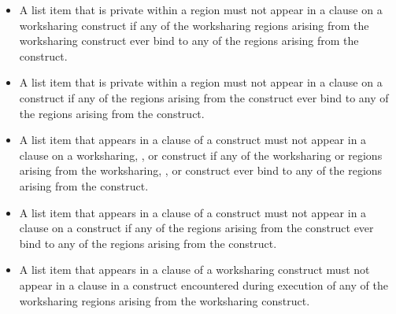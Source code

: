 \begin{itemize}
\item A list item that is private within a  region must
not appear in a  clause on a worksharing construct
if any of the worksharing regions arising
from the worksharing construct ever bind to any of the
 regions arising from the  construct.

\item A list item that is private within a  region must not appear in a
 clause on a  construct if any of the 
regions arising from the  construct ever bind to any of the 
regions arising from the  construct.

\item A list item that appears in a  clause of a 
construct must not appear in a  clause on a worksharing, ,
or  construct if any of the worksharing or  regions arising from
the worksharing, , or  construct ever bind to any of the
 regions arising from the  construct.

\item A list item that appears in a  clause of a  construct must not
appear in a  clause on a  construct if any of the
 regions arising from the  construct ever bind to any of
the  regions arising from the  construct.

\item A list item that appears in a  clause of a worksharing construct must not
appear in a  clause in a  construct encountered during execution
of any of the worksharing regions arising from the worksharing construct.

%
%
\end{itemize}










